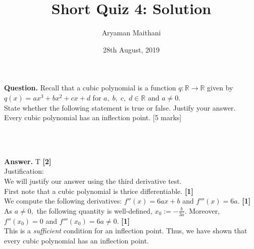 \documentclass{article}
\title{Short Quiz 4: Solution}      %
\author{Aryaman Maithani}
\date{28th August, 2019}			 %
\begin{document}
\maketitle

\hrulefill

\textbf{Question.}
Recall that a cubic polynomial is a function $q:\mathbb{R} \to \mathbb{R}$ given by $q(x) = ax^3 + bx^2 + cx + d$ for $a,\;b,\;c,\;d \in \mathbb{R}$ and $a \neq 0.$\\
State whether the following statement is true or false. Justify your answer.\\ 
Every cubic polynomial has an inflection point.
\hfill [5 marks]
\begin{flushright}
	\\~\\
\end{flushright}

\hrulefill

\textbf{Answer.} T \hfill \textbf{[2]}\\  %
Justification: \\
We will justify our answer using the third derivative test. \\
First note that a cubic polynomial is thrice differentiable. \hfill \textbf{[1]}\\
We compute the following derivatives: $f''(x) = 6ax + b$ and $f'''(x) = 6a.$ \hfill \textbf{[1]}\\
As $a \neq 0,$ the following quantity is well-defined, $x_0 := -\frac{b}{3a}.$ Moreover, $f''(x_0) = 0$ and $f'''(x_0) = 6a \neq 0.$ \hfill \textbf{[1]}\\
This is a \emph{sufficient} condition for an inflection point. Thus, we have shown that every cubic polynomial has an inflection point.

\hrulefill

\vspace{0.2 cm}
\end{document}
